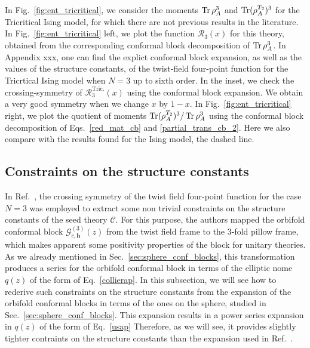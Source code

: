 \documentclass[a4paper,11pt]{article}
\def\Tr{\mathop{\mbox{\normalfont Tr}}\nolimits}
\begin{document}
In Fig.~\ref{fig:ent_tricritical}, we consider the moments $\Tr\rho_A^3$ and 
$\Tr(\rho_A^{T_2})^3$ for the Tricritical Ising model, for which there are not 
previous results in the literature. In Fig.~\ref{fig:ent_tricritical} left, we plot 
the function $\mathcal{R}_3(x)$ for this theory, obtained from the corresponding conformal block 
decomposition of $\Tr\rho_A^3$. In Appendix xxx, one can find the explict conformal block expansion, 
as well as the values of the structure constants, of the twist-field four-point function for the 
Tricrtical Ising model when $N=3$ up to sixth order. In the inset, we check the crossing-symmetry 
of $\mathcal{R}_3^{\text{Tric.}}(x)$ using the conformal block expansion. We obtain a very good 
symmetry when we change $x$ by $1-x$. In Fig.~\ref{fig:ent_tricritical} right, we plot the quotient 
of moments $\Tr(\rho_A^{T_2})^3/\Tr\rho_A^3$ using the conformal block decomposition of Eqs.~\eqref{red_mat_cb} and \eqref{partial_trans_cb_2}.  Here we also compare with the results found for the Ising model, the dashed line. 



\subsection{Constraints on the structure constants}

In Ref.~\cite{Collier}, the crossing symmetry of the twist field four-point 
function for the case $N=3$ was employed to extract some non trivial constraints on the 
structure constants of the seed theory $\mathcal{C}$. For this purpose, the authors mapped 
the orbifold conformal block $\mathcal{G}_{c, \boldsymbol{h}}^{(3)}(z)$ from the 
twist field frame to the 3-fold pillow frame, which makes apparent some positivity properties of 
the block for unitary theories. As we already mentioned in Sec.~\ref{sec:sphere_conf_blocks}, this transformation
produces a series for the orbifold conformal block in terms of the elliptic nome $q(z)$
of the form of Eq.~\eqref{collierap}. In this subsection, we will see how to rederive 
such constraints on the structure constants from the expansion of the orbifold 
conformal blocks in terms of the ones on the sphere, studied in Sec.~\ref{sec:sphere_conf_blocks}. This 
expansion results in a power series expansion in $q(z)$ of the form of Eq.~\eqref{usap}
Therefore, as we will see, it provides slightly tighter contraints on the structure
constants than the expansion used in Ref.~\cite{Collier}.
\end{document}
